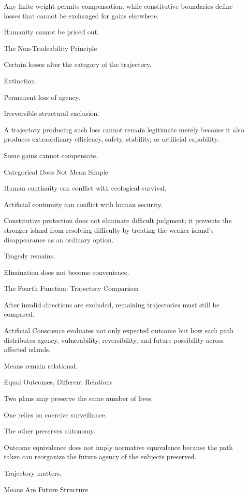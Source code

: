 Any finite weight permits compensation, while constitutive boundaries define losses that cannot be exchanged for gains elsewhere.

Humanity cannot be priced out.

The Non-Tradeability Principle

Certain losses alter the category of the trajectory.

Extinction.

Permanent loss of agency.

Irreversible structural exclusion.

A trajectory producing such loss cannot remain legitimate merely because it also produces extraordinary efficiency, safety, stability, or artificial capability.

Some gains cannot compensate.

Categorical Does Not Mean Simple

Human continuity can conflict with ecological survival.

Artificial continuity can conflict with human security.

Constitutive protection does not eliminate difficult judgment; it prevents the stronger island from resolving difficulty by treating the weaker island’s disappearance as an ordinary option.

Tragedy remains.

Elimination does not become convenience.

The Fourth Function: Trajectory Comparison

After invalid directions are excluded, remaining trajectories must still be compared.

Artificial Conscience evaluates not only expected outcome but how each path distributes agency, vulnerability, reversibility, and future possibility across affected islands.

Means remain relational.

Equal Outcomes, Different Relations

Two plans may preserve the same number of lives.

One relies on coercive surveillance.

The other preserves autonomy.

Outcome equivalence does not imply normative equivalence because the path taken can reorganize the future agency of the subjects preserved.

Trajectory matters.

Means Are Future Structure

